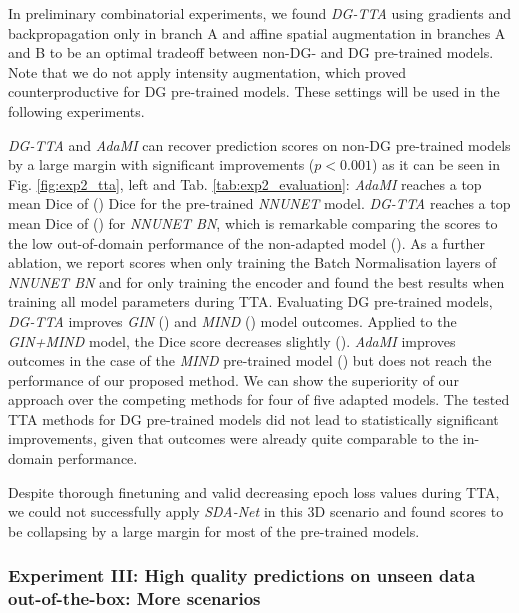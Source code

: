             In preliminary combinatorial experiments, we found \emph{DG-TTA} using gradients and backpropagation only in branch A and affine spatial augmentation in branches A and B to be an optimal tradeoff between non-DG-  and DG pre-trained models. Note that we do not apply intensity augmentation, which proved counterproductive for DG pre-trained models. These settings will be used in the following experiments.

            \emph{DG-TTA} and \emph{AdaMI} can recover prediction scores on non-DG pre-trained models by a large margin with significant improvements ($p<0.001$) as it can be seen in Fig. \ref{fig:exp2_tta}, left and Tab. \ref{tab:exp2_evaluation}: \emph{AdaMI} reaches a top mean Dice of  () Dice for the pre-trained \emph{NNUNET} model. \emph{DG-TTA} reaches a top mean Dice of  () for \emph{NNUNET BN}, which is remarkable comparing the scores to the low out-of-domain performance of the non-adapted model (). As a further ablation, we report scores when only training the Batch Normalisation layers of \emph{NNUNET BN} and for only training the encoder and found the best results when training all model parameters during TTA.
            Evaluating DG pre-trained models, \emph{DG-TTA} improves \emph{GIN} () and \emph{MIND} () model outcomes. Applied to the \emph{GIN+MIND} model, the Dice score decreases slightly (). \emph{AdaMI} improves outcomes in the case of the \emph{MIND} pre-trained model () but does not reach the performance of our proposed method. We can show the superiority of our approach over the competing methods for four of five adapted models. The tested TTA methods for DG pre-trained models did not lead to statistically significant improvements, given that outcomes were already quite comparable to the in-domain performance.

            Despite thorough finetuning and valid decreasing epoch loss values during TTA, we could not successfully apply \emph{SDA-Net} in this 3D scenario and found scores to be collapsing by a large margin for most of the pre-trained models.

        \subsubsection{Experiment III: High quality predictions on unseen data out-of-the-box: More scenarios}
            \label{sec:exp3_results}

